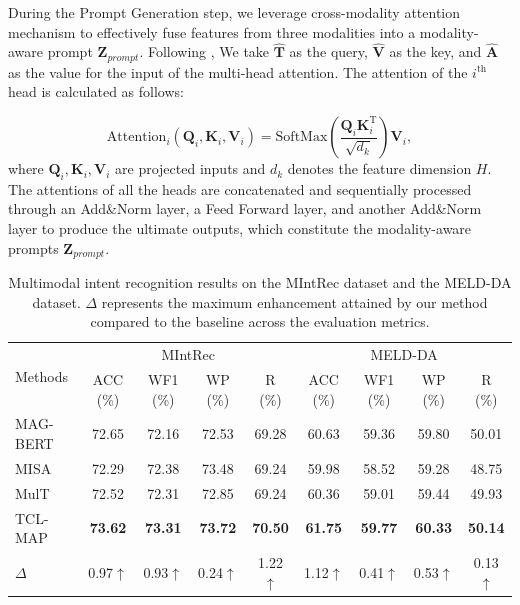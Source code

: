 \documentclass[letterpaper]{article} %
\begin{document}
During the Prompt Generation step, we leverage cross-modality attention mechanism to effectively fuse features from three modalities into a modality-aware prompt $\textbf{Z}_{prompt}$. Following \cite{tsai2019multimodal}, We take $\hat{\textbf{T}}$ as the query, $\hat{\textbf{V}}$ as the key, and $\hat{\textbf{A}}$ as the value for the input of the multi-head attention. The attention of the $i^{\text{th}}$ head is calculated as follows:

\begin{equation}
    \text{Attention}_{i}(\textbf{Q}_{i}, \textbf{K}_{i}, \textbf{V}_{i}) = \text{SoftMax}(\frac{\textbf{Q}_{i}\textbf{K}_{i}^{\text{T}}}{\sqrt{d_{k}}})\textbf{V}_{i},
\end{equation}
where $\textbf{Q}_{i}, \textbf{K}_{i}, \textbf{V}_{i}$ are projected inputs and $d_{k}$ denotes the feature dimension $H$. The attentions of all the heads are concatenated and sequentially processed through an Add\&Norm layer, a Feed Forward layer, and another Add\&Norm layer to produce the ultimate outputs, which constitute the modality-aware prompts $\textbf{Z}_{prompt}$.


\begin{table}[t!]
	\centering
	\begin{tabular}{@{\extracolsep{11pt}}l|cccc|cccc}
		\toprule
		\multirow{2}{*}{Methods}
            & \multicolumn{4}{c|}{MIntRec}& \multicolumn{4}{c}{MELD-DA}\\

		& ACC (\%) & WF1 (\%) & WP (\%) & R (\%) & ACC (\%) & WF1 (\%) & WP (\%) & R (\%) \\
		\midrule
		MAG-BERT & 72.65 & 72.16 & 72.53 & 69.28 & 60.63 & 59.36 & 59.80  & 50.01  \\

            MISA & 72.29 & 72.38 & 73.48 & 69.24 & 59.98 & 58.52 & 59.28  & 48.75  \\

		MulT & 72.52 & 72.31 & 72.85 & 69.24 & 60.36 & 59.01 & 59.44  & 49.93  \\

		\midrule

		TCL-MAP &
		\textbf{73.62} &
		\textbf{73.31} &
		\textbf{73.72} &
		\textbf{70.50} &
		\textbf{61.75} &
		\textbf{59.77} &
		\textbf{60.33}  &
		\textbf{50.14}  \\
		$\Delta$ & 0.97$\uparrow$ & 0.93$\uparrow$ & 0.24$\uparrow$ &
		1.22$\uparrow$ & 1.12$\uparrow$ & 0.41$\uparrow$ & 0.53$\uparrow$  & 0.13$\uparrow$ \\
		\bottomrule
	\end{tabular}
 \caption{\protect \label{results}
	Multimodal intent recognition results on the MIntRec dataset and the MELD-DA dataset. $\Delta$ represents the maximum enhancement attained by our method compared to the baseline across the evaluation metrics.}

\end{table}
\end{document}
